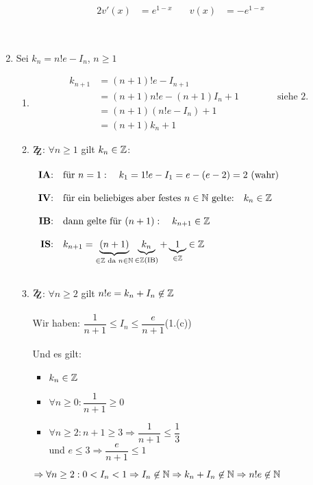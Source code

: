 \begin{Beweis}
\begin{enumerate}
\begin{minipage}{0.45\textwidth}
\begin{alignat*}{2}
v'(x)&=e^{1-x}\quad & v(x)&=-e^{1-x}
\end{alignat*}
\end{minipage}
 \\
\item Sei $k_n=n!e-I_n$, $n\geq1$
\begin{enumerate}
\item
\begin{align*}
k_{n+1}&=(n+1)!e-I_{n+1}\\
&=(n+1)n!e-(n+1)I_n+1\qquad\qquad\mbox{siehe 2.}\\
&=(n+1)(n!e-I_n)+1\\
&=(n+1)k_n+1
\end{align*}
\item $\zz$: $\forall n\geq1$ gilt $k_n\in\mathbb{Z}$:\\\\
$\begin{array}{rl}
\mbox{\textbf{IA}:} & \mbox{für }n=1:\quad k_1=1!e-I_1=e-(e-2)=2 \mbox{ (wahr)} \\\\
\mbox{\textbf{IV}:} & \mbox{für ein beliebiges aber festes }n\in\mathbb{N} \mbox{ gelte:}\quad k_n\in\mathbb{Z}\\\\
\mbox{\textbf{IB}:} & \mbox{dann gelte für }(n+1):\quad k_{n+1}\in\mathbb{Z}\\\\
\mbox{\textbf{IS}:} & k_{n+1}=\underbrace{(n+1)}_{\in\mathbb{Z}\text{ da }n\in\mathbb{N}}\underbrace{k_n}_{\in\mathbb{Z}\text{(IB)}}+\underbrace{1}_{\in\mathbb{Z}}\in\mathbb{Z}\\\\
\end{array}$
\item $\zz$: $\forall n\geq 2$ gilt $n!e=k_n+I_n\not\in\mathbb{Z}$\\\\
Wir haben: $\dfrac{1}{n+1}\leq I_n \leq  \dfrac{e}{n+1}$\quad(1.(c))\\\\
Und es gilt: \begin{itemize}\item$k_n\in\mathbb{Z}$
				\item $\forall n\geq0:\dfrac{1}{n+1}\geq 0$
				\item $\forall n\geq2:n+1\geq3\Rightarrow \dfrac{1}{n+1}\leq \dfrac{1}{3}$\\
					und $e\leq3 \Rightarrow \dfrac{e}{n+1}\leq 1$\\
		\end{itemize}
$\Rightarrow\forall n\geq2:0<I_n<1\Rightarrow I_n\not\in\mathbb{N}\Rightarrow k_n+I_n\not\in\mathbb{N}\Rightarrow n!e\not\in\mathbb{N}$\end{enumerate}

\end{enumerate}
\end{Beweis}
